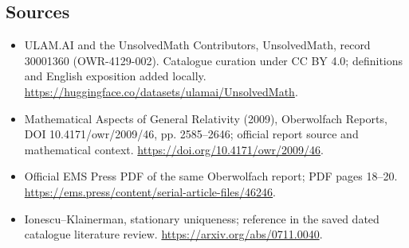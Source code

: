 \documentclass[11pt]{article}
\begin{document}
\subsection{Sources}
\begin{itemize}
\item[\hypertarget{source:30001360:1}{S1}] ULAM.AI and the UnsolvedMath Contributors, UnsolvedMath, record 30001360 (OWR-4129-002). Catalogue curation under CC BY 4.0; definitions and English exposition added locally.
\url{https://huggingface.co/datasets/ulamai/UnsolvedMath}.
\item[\hypertarget{source:30001360:2}{S2}] Mathematical Aspects of General Relativity (2009), Oberwolfach Reports, DOI 10.4171/owr/2009/46, pp. 2585--2646; official report source and mathematical context.
\url{https://doi.org/10.4171/owr/2009/46}.
\item[\hypertarget{source:30001360:3}{S3}] Official EMS Press PDF of the same Oberwolfach report; PDF pages 18--20.
\url{https://ems.press/content/serial-article-files/46246}.
\item[\hypertarget{source:30001360:4}{S4}] Ionescu--Klainerman, stationary uniqueness; reference in the saved dated catalogue literature review.
\url{https://arxiv.org/abs/0711.0040}.
\end{itemize}
\label{end:30001360}
\end{document}

